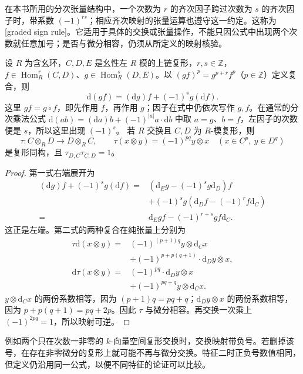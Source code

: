 在本书所用的分次张量结构中，一个次数为 \(r\) 的齐次因子跨过次数为 \(s\) 的齐次因子时，带系数 \((-1)^{rs}\)；相应齐次映射的张量运算也遵守这一约定。这称为[graded sign rule]。它适用于具体的交换或张量操作，不能只因公式中出现两个次数就任意加号；是否与微分相容，仍须从所定义的映射核验。

\begin{proposition}\label{b4:prop:graded-leibniz}
	设 \(R\) 为含幺环，\(C,D,E\) 是幺性左 \(R\) 模的上链复形，\(r,s\in\mathbb Z\)，\(f\in\operatorname{Hom}_R^r(C,D)\)、\(g\in\operatorname{Hom}_R^s(D,E)\)。以 \((gf)^p=g^{p+r}f^p\)（\(p\in\mathbb Z\)）定义复合，则
	\[
		\mathrm{d}(gf)=(\mathrm{d}g)f+(-1)^s g(\mathrm{d}f).
	\]
	这里 \(gf=g\circ f\)，即先作用 \(f\)，再作用 \(g\)；因子在式中仍依次写作 \(g,f\)。在通常的分次乘法公式 \(\mathrm{d}(ab)=(\mathrm{d}a)b+(-1)^{|a|}a\cdot\mathrm{d}b\) 中取 \(a=g\)、\(b=f\)，左因子的次数便是 \(s\)，所以这里出现 \((-1)^s\)。 若 \(R\) 交换且 \(C,D\) 为 \(R\)-模复形，则
	\[
		\tau:C\otimes_R D\longrightarrow D\otimes_R C, \qquad \tau(x\otimes y)=(-1)^{pq}y\otimes x \quad(x\in C^p,\ y\in D^q)
	\]
	是复形同构，且 \(\tau_{D,C}\tau_{C,D}=1\)。
\end{proposition}
\begin{proof}
	第一式右端展开为
	\[
		\begin{aligned}
			(\mathrm{d}g)f+(-1)^s g(\mathrm{d}f) ={}&(\mathrm{d}_Eg-(-1)^sg\mathrm{d}_D)f\\
			&+(-1)^sg(\mathrm{d}_Df-(-1)^rf\mathrm{d}_C)\\
			={}&\mathrm{d}_Egf-(-1)^{r+s}gf\mathrm{d}_C.
		\end{aligned}
	\]
	这正是左端。第二式的两种复合在纯张量上分别为
	\[
		\begin{aligned}
			\tau\mathrm{d}(x\otimes y) ={}&(-1)^{(p+1)q}y\otimes\mathrm{d}_Cx\\
			&+(-1)^{p+p(q+1)}\cdot\mathrm{d}_Dy\otimes x,\\
			\mathrm{d}\tau(x\otimes y) ={}&(-1)^{pq}\cdot\mathrm{d}_Dy\otimes x\\
			&+(-1)^{pq+q}y\otimes\mathrm{d}_Cx.
		\end{aligned}
	\]
	\(y\otimes\mathrm{d}_Cx\) 的两份系数相等，因为 \((p+1)q=pq+q\)；\(\mathrm{d}_Dy\otimes x\) 的两份系数相等，因为 \(p+p(q+1)=pq+2p\)。因此 \(\tau\) 与微分相容。再交换一次乘上 \((-1)^{2pq}=1\)，所以映射可逆。
\end{proof}

例如两个只在次数一非零的 \(k\)-向量空间复形交换时，交换映射带负号。若删掉该号，在存在非零微分的复形上就可能不再与微分交换。特征二时正负号数值相同，但定义仍沿用同一公式，以便不同特征的论证可以比较。
